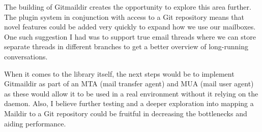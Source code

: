 The building of Gitmaildir creates the opportunity to explore this area further. The plugin system in conjunction with access to a Git repository means that novel features could be added very quickly to expand how we use our mailboxes. One such suggestion I had was to support true email threads where we can store separate threads in different branches to get a better overview of long-running conversations.

When it comes to the library itself, the next steps would be to implement Gitmaildir as part of an MTA (mail transfer agent) and MUA (mail user agent) as these would allow it to be used in a real environment without it relying on the daemon. Also, I believe further testing and a deeper exploration into mapping a Maildir to a Git repository could be fruitful in decreasing the bottlenecks and aiding performance.

